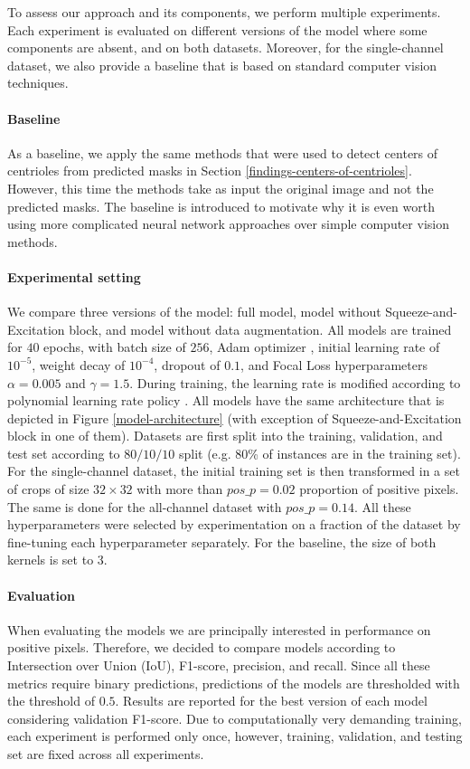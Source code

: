 \documentclass[9pt,conference,compsocconf, article]{IEEEtran}
\begin{document}
To assess our approach and its components, we perform multiple experiments. Each experiment is evaluated on different versions of the model where some components are absent, and on both datasets. Moreover, for the single-channel dataset, we also provide a baseline that is based on standard computer vision techniques. 


\paragraph{Baseline}
As a baseline, we apply the same methods that were used to detect centers of centrioles from predicted masks in Section \ref{findings-centers-of-centrioles}. However, this time the methods take as input the original image and not the predicted masks. The baseline is introduced to motivate why it is even worth using more complicated neural network approaches over simple computer vision methods.


\paragraph{Experimental setting}
We compare three versions of the model: full model, model without Squeeze-and-Excitation block, and model without data augmentation. All models are trained for $40$ epochs, with batch size of $256$, Adam optimizer \cite{kingma2015adam}, initial learning rate of $10^{-5}$, weight decay of $10^{-4}$, dropout of $0.1$, and Focal Loss hyperparameters $\alpha=0.005$ and $\gamma=1.5$. During training, the learning rate is modified according to polynomial learning rate policy \cite{mishra2019polynomial}. All models have the same architecture that is depicted in Figure \ref{model-architecture} (with exception of Squeeze-and-Excitation block in one of them). 
Datasets are first split into the training, validation, and test set according to $80/10/10$ split (e.g. 80\% of instances are in the training set). For the single-channel dataset, the initial training set is then transformed in a set of crops of size $32\times 32$ with more than $pos\_p = 0.02$ proportion of positive pixels. The same is done for the all-channel dataset with $pos\_p = 0.14$. All these hyperparameters were selected by experimentation on a fraction of the dataset by fine-tuning each hyperparameter separately. For the baseline, the size of both kernels is set to 3. 

\paragraph{Evaluation}
When evaluating the models we are principally interested in performance on positive pixels. Therefore, we decided to compare models according to Intersection over Union (IoU), F1-score, precision, and recall. Since all these metrics require binary predictions, predictions of the models are thresholded with the threshold of $0.5$. Results are reported for the best version of each model considering validation F1-score. Due to computationally very demanding training, each experiment is performed only once, however, training, validation, and testing set are fixed across all experiments.
\end{document}
